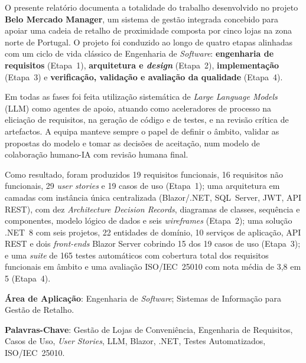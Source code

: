 \documentclass[a4paper,12pt]{scrreprt}
\begin{document}
\setcounter{secnumdepth}{3}
\setcounter{tocdepth}{3}

\makecover



\renewenvironment{abstract}
 {\par\noindent\textbf{\Large\abstractname}\par\bigskip}
 {}

\begin{flushleft}
\begin{abstract}
    O presente relatório documenta a totalidade do trabalho desenvolvido no projeto \textbf{Belo Mercado Manager}, um sistema de gestão integrada concebido para apoiar uma cadeia de retalho de proximidade composta por cinco lojas na zona norte de Portugal. O projeto foi conduzido ao longo de quatro etapas alinhadas com um ciclo de vida clássico de Engenharia de \textit{Software}: \textbf{engenharia de requisitos} (Etapa~1), \textbf{arquitetura e \textit{design}} (Etapa~2), \textbf{implementação} (Etapa~3) e \textbf{verificação, validação e avaliação da qualidade} (Etapa~4).

    Em todas as fases foi feita utilização sistemática de \textit{Large Language Models} (LLM) como agentes de apoio, atuando como aceleradores de processo na eliciação de requisitos, na geração de código e de testes, e na revisão crítica de artefactos. A equipa manteve sempre o papel de definir o âmbito, validar as propostas do modelo e tomar as decisões de aceitação, num modelo de colaboração humano-IA com revisão humana final.

    Como resultado, foram produzidos 19 requisitos funcionais, 16 requisitos não funcionais, 29 \textit{user stories} e 19 casos de uso (Etapa~1); uma arquitetura em camadas com instância única centralizada (Blazor/.NET, SQL~Server, JWT, API REST), com dez \textit{Architecture Decision Records}, diagramas de classes, sequência e componentes, modelo lógico de dados e seis \textit{wireframes} (Etapa~2); uma solução .NET~8 com seis projetos, 22 entidades de domínio, 10 serviços de aplicação, API REST e dois \textit{front-ends} Blazor Server cobrindo 15 dos 19 casos de uso (Etapa~3); e uma \textit{suite} de 165 testes automáticos com cobertura total dos requisitos funcionais em âmbito e uma avaliação ISO/IEC~25010 com nota média de 3,8 em 5 (Etapa~4).

    \par \textbf{Área de Aplicação}: Engenharia de \textit{Software}; Sistemas de Informação para Gestão de Retalho.
    \par \textbf{Palavras-Chave}: Gestão de Lojas de Conveniência, Engenharia de Requisitos, Casos de Uso, \textit{User Stories}, LLM, Blazor, .NET, Testes Automatizados, ISO/IEC~25010.
\end{abstract}
\end{flushleft}
\end{document}
